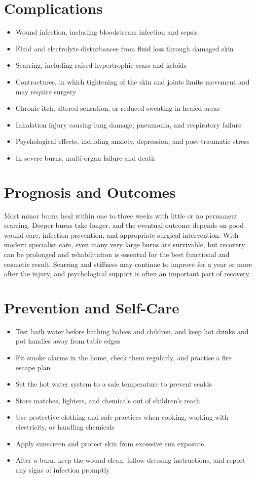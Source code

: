 \section*{Complications}
\begin{itemize}
    \item Wound infection, including bloodstream infection and sepsis
    \item Fluid and electrolyte disturbances from fluid loss through damaged skin
    \item Scarring, including raised hypertrophic scars and keloids
    \item Contractures, in which tightening of the skin and joints limits movement and may require surgery
    \item Chronic itch, altered sensation, or reduced sweating in healed areas
    \item Inhalation injury causing lung damage, pneumonia, and respiratory failure
    \item Psychological effects, including anxiety, depression, and post-traumatic stress
    \item In severe burns, multi-organ failure and death
\end{itemize}

\section*{Prognosis and Outcomes}
Most minor burns heal within one to three weeks with little or no permanent scarring. Deeper burns take longer, and the eventual outcome depends on good wound care, infection prevention, and appropriate surgical intervention. With modern specialist care, even many very large burns are survivable, but recovery can be prolonged and rehabilitation is essential for the best functional and cosmetic result. Scarring and stiffness may continue to improve for a year or more after the injury, and psychological support is often an important part of recovery.

\section*{Prevention and Self-Care}
\begin{itemize}
    \item Test bath water before bathing babies and children, and keep hot drinks and pot handles away from table edges
    \item Fit smoke alarms in the home, check them regularly, and practise a fire escape plan
    \item Set the hot water system to a safe temperature to prevent scalds
    \item Store matches, lighters, and chemicals out of children's reach
    \item Use protective clothing and safe practices when cooking, working with electricity, or handling chemicals
    \item Apply sunscreen and protect skin from excessive sun exposure
    \item After a burn, keep the wound clean, follow dressing instructions, and report any signs of infection promptly
\end{itemize}

